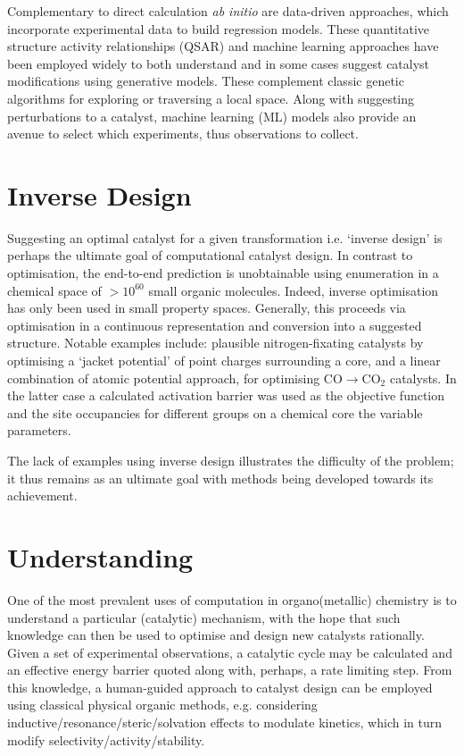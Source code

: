 \documentclass[../main.tex]{subfiles}
\begin{document}
Complementary to direct calculation \emph{ab initio} are data-driven approaches, which  incorporate experimental data to build regression models. These quantitative structure activity relationships (QSAR)\cite{Muratov2020} and machine learning\cite{Toyao2019, Kitchin2018, Friederich2020} approaches have been employed widely to both understand and in some cases suggest catalyst modifications using generative models.\cite{GmezBombarelli2018} These complement classic genetic algorithms for exploring or traversing\cite{Nigam2021} a local space.\cite{goldberg1989genetic} Along with suggesting perturbations to a catalyst, machine learning (ML) models also provide an avenue to select which experiments, thus observations to collect.\cite{Henle2020, Zahrt2021} 

\section{Inverse Design}

Suggesting an optimal catalyst for a given transformation i.e. `inverse design' is perhaps the ultimate goal of computational catalyst design. In contrast to optimisation, the end-to-end prediction is unobtainable using enumeration in a chemical space of $>10^{60}$ small organic molecules.\cite{Kirkpatrick2004} Indeed, inverse optimisation has only been used in small property spaces.\cite{Freeze2019, Foscato2020} Generally, this proceeds via optimisation in a continuous representation and conversion into a suggested structure. Notable examples include: plausible nitrogen-fixating catalysts by optimising a `jacket potential' of point charges surrounding a core,\cite{Weymuth2014} and a linear combination of atomic potential approach, for optimising CO$\rightarrow$CO$_2$ catalysts.\cite{Chang2018} In the latter case a calculated activation barrier was used as the objective function and the site occupancies for different groups on a chemical core the variable parameters. 

The lack of examples using inverse design illustrates the difficulty of the problem; it thus remains as an ultimate goal with methods being developed towards its achievement.


\section{Understanding}

One of the most prevalent uses of computation in organo(metallic) chemistry is to understand a particular (catalytic) mechanism, with the hope that such knowledge can then be used to optimise and design new catalysts rationally.\cite{Norskov2011, Tantillo2016} Given a set of experimental observations, a catalytic cycle may be calculated and an effective energy barrier quoted along with, perhaps, a rate limiting step.\cite{Kozuch2011} From this knowledge, a human-guided approach to catalyst design can be employed using classical physical organic methods, e.g. considering inductive/resonance/steric/solvation effects to modulate kinetics, which in turn modify selectivity/activity/stability.\cite{Anslyn2006} 
\end{document}
